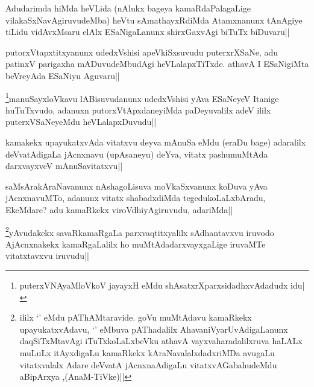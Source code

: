 \begin{artha}
Adudarimda hiMda heVLida (nAlukx bageya kamaRdaPalagaLige vilakaSxNavAgiruvudeMba) heVtu sAmathayxRdiMda Atamxnanunx tAnAgiye tiLidu vidAvxMsaru elAlx ESaNigaLanunx shirxGaxvAgi biTuTx biDuvaru||
\end{artha}


\begin{artha}
putorxVtapxtitxyanunx udedxVshisi apeVkiSxsuvudu puterxrXSaNe, adu patinxV parigaxha mADuvudeMbudAgi heVLalapxTiTxde. athavA I ESaNigiMta beVreyAda ESaNiyu Aguvaru|| 
\end{artha}


\begin{artha}
\footnote{puterxVNAyaMloVkoV jayayxH eMdu shAsatxrXparxsidadhxvAdadudx idu|}manuSayxloVkavu lABisuvudanunx udedxVshisi yAva ESaNeyeV Itanige huTuTxvudo, adanuxn putorxVtApxdaneyiMda paDeyuvalilx adeV ililx puterxVSaNeyeMdu heVLalapxDuvudu||
\end{artha}


\begin{artha}
kamakekx upayukatxvAda vitatxvu deyva mAnuSa eMdu (eraDu bage) adaralilx deVvatAdigaLa jAcnxnavu (upAsaneyu) deYva, vitatx pashumuMtAda darxvayxveV mAnuSavitatxvu||
\end{artha}


\begin{artha}
saMsArakAraNavanunx nAshagoLisuva moVkaSxvanunx koDuva yAva jAcnxnavuMTo, adanunx vitatx shabadxdiMda tegedukoLaLxbAradu, EkeMdare? adu kamaRkekx viroVdhiyAgiruvudu, adariMda||
\end{artha}


\begin{artha}
\footnote{ililx `\stext' eMdu pAThAMtaravide. goVu muMtAdavu kamaRkekx upayukatxvAdavu, `\stext' eMbuva pAThadalilx AhavaniVyarUvAdigaLanunx daqSiTxMtavAgi iTuTxkoLaLxbeVku athavA vayxvaharadalilxruva haLALx muLuLx itAyxdigaLu kamaRkekx kAraNavalalxdadxriMDa avugaLu vitatxvalalx Adare deVvatA jAcnxnaAdigaLu vitatxvAGabahudeMdu aBipArxya ,(AnaM-TiVke)||}yAvudakekx savaRkamaRgaLa parxvaqtitxyalilx sAdhantavxvu iruvodo AjAcnxnakekx kamaRgaLalilx ho muMtAdadarxvayxgaLige iruvaMTe vitatxtavxvu iruvudu||
\end{artha}

